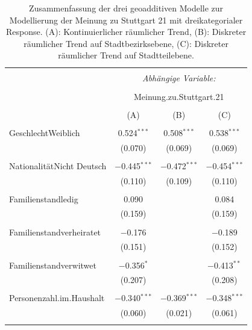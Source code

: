 \documentclass{Vorlage}
\begin{document}
\begin{appendix}
\clearpage

\begin{table}[h] \centering 
  \caption{Zusammenfassung der drei geoadditiven Modelle zur Modellierung der Meinung zu Stuttgart 21 mit dreikategorialer Response. (A): Kontinuierlicher räumlicher Trend, (B): Diskreter räumlicher Trend auf Stadtbezirksebene, (C): Diskreter räumlicher Trend auf Stadtteilebene.} 
  \label{ParameterTabS213spat} 
\begin{tabular}{@{\extracolsep{5pt}}lccc} 
\\[-1.8ex]\hline 
\hline \\[-1.8ex] 
 & \multicolumn{3}{c}{\textit{Abhängige Variable:}} \\ 
\cline{2-4} 
\\[-1.8ex] & \multicolumn{3}{c}{Meinung.zu.Stuttgart.21} \\ 
\\[-1.8ex] & (A) & (B) & (C)\\ 
\hline \\[-1.8ex] 
 GeschlechtWeiblich & 0.524$^{***}$ & 0.508$^{***}$ & 0.538$^{***}$ \\ 
  & (0.070) & (0.069) & (0.069) \\ 
  & & & \\ 
 NationalitätNicht Deutsch & $-$0.445$^{***}$ & $-$0.472$^{***}$ & $-$0.454$^{***}$ \\ 
  & (0.110) & (0.109) & (0.110) \\ 
  & & & \\ 
 Familienstandledig & 0.090 &  & 0.084 \\ 
  & (0.159) &  & (0.159) \\ 
  & & & \\ 
 Familienstandverheiratet & $-$0.176 &  & $-$0.189 \\ 
  & (0.151) &  & (0.152) \\ 
  & & & \\ 
 Familienstandverwitwet & $-$0.356$^{*}$ &  & $-$0.413$^{**}$ \\ 
  & (0.207) &  & (0.208) \\ 
  & & & \\ 
 Personenzahl.im.Haushalt & $-$0.340$^{***}$ & $-$0.369$^{***}$ & $-$0.348$^{***}$ \\ 
  & (0.060) & (0.021) & (0.061) \\ 
  & & & \\ \hline

\end{tabular}
\end{table}
\end{appendix}
\end{document}
